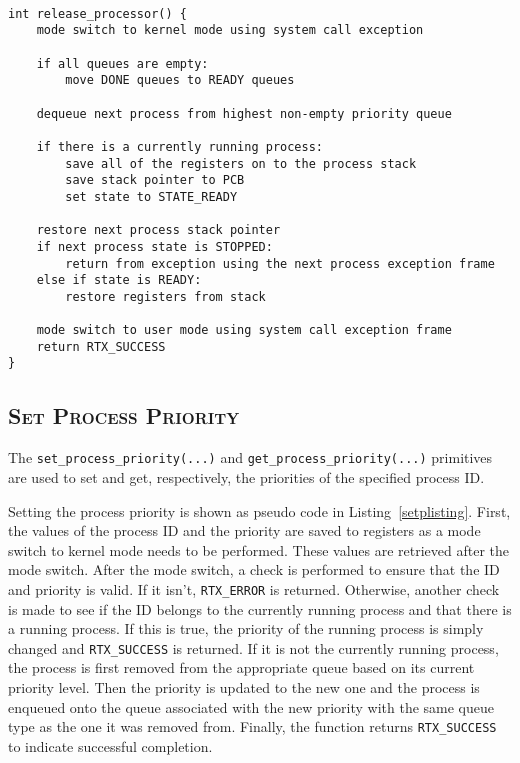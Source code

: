 \documentclass[oneside]{report}
\begin{document}
\begin{lstlisting}

int release_processor() {
    mode switch to kernel mode using system call exception

    if all queues are empty:
        move DONE queues to READY queues

    dequeue next process from highest non-empty priority queue

    if there is a currently running process:
        save all of the registers on to the process stack
        save stack pointer to PCB
        set state to STATE_READY

    restore next process stack pointer
    if next process state is STOPPED:
        return from exception using the next process exception frame
    else if state is READY: 
        restore registers from stack
    
    mode switch to user mode using system call exception frame
    return RTX_SUCCESS
}
\end{lstlisting}

\subsection{\textsc{Set Process Priority}}
The \texttt{set\_process\_priority(...)} and \texttt{get\_process\_priority(...)}
primitives are used to set and get, respectively, the priorities of the 
specified process ID. 

Setting the process priority is shown as pseudo code in
Listing~\ref{setplisting}. First, the values of the process ID and the priority
are saved to registers as a mode switch to kernel mode needs to be performed.
These values are retrieved after the mode switch. After the mode switch, a
check is performed to ensure that the ID and priority is valid. If it isn't,
\texttt{RTX\_ERROR} is returned. Otherwise, another check is made to see if the
ID belongs to the currently running process and that there is a running
process. If this is true, the priority of the running process is simply changed 
and \texttt{RTX\_SUCCESS} is returned. If it is not the currently running 
process, the process is first removed from the appropriate queue based on its 
current priority level. Then the priority is updated to the new one and the 
process is enqueued onto the queue associated with the new priority with the 
same queue type as the one it was removed from. Finally, the function returns 
\texttt{RTX\_SUCCESS} to indicate successful completion.
\end{document}

